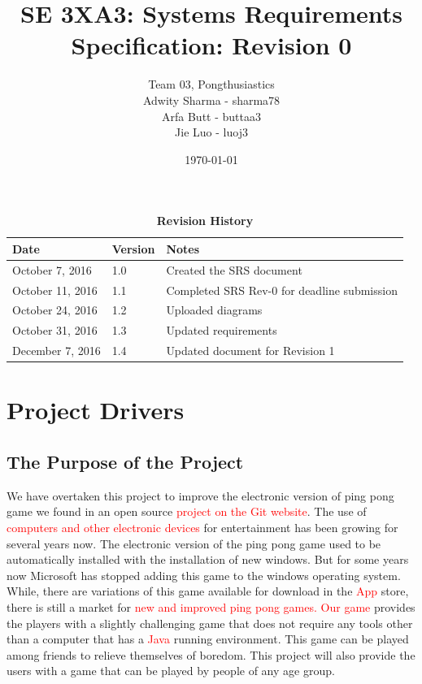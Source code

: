 \documentclass[12pt,letterpaper]{article}
\title{SE 3XA3: Systems Requirements Specification: Revision 0}
\author{Team 03, Pongthusiastics 		
\\ Adwity Sharma - sharma78 		
\\ Arfa Butt - buttaa3 	
\\ Jie Luo - luoj3 }
\date{\today}
\begin{document}
\maketitle
\newpage
\tableofcontents

\listoftables
\listoffigures
\begin{table}[h]
\caption{\bf Revision History}
\begin{tabularx}{\textwidth}{p{3.5cm}p{2cm}X}
\toprule {\bf Date} & {\bf Version} & {\bf Notes}\\
\midrule
October 7, 2016 & 1.0 & Created the SRS document \\
October 11, 2016 & 1.1 & Completed SRS Rev-0 for deadline submission\\
October 24, 2016 & 1.2 & Uploaded diagrams \\
October 31, 2016 & 1.3 & Updated requirements \\
December 7, 2016 & 1.4 & Updated document for Revision 1\\

\bottomrule
\end{tabularx}
\end{table}

\newpage


	
	\section{Project Drivers}
	\subsection{The Purpose of the Project}
	We have overtaken this project to improve the electronic version of ping pong game we found in an open source \textcolor{red}{project on the Git website}. The use of \textcolor{red}{computers and other electronic devices} for entertainment has been growing for several years now. The electronic version of the ping pong game used to be automatically installed with the installation of new windows. But for some years now Microsoft has stopped adding this game to the windows operating system. While, there are variations of this game available for download in the \textcolor{red}{App} store, there is still a market for \textcolor{red}{new and improved ping pong games. Our game} provides the players with a slightly challenging game that does not require any tools other than a computer that has a \textcolor{red}{Java} running environment. This game can be played among friends to relieve themselves of boredom. This project will also provide the users with a game that can be played by people of any age group. \\
\end{document}
